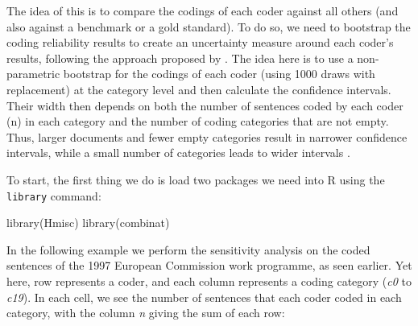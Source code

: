 \documentclass[
]{article}
\newenvironment{Shaded}{\begin{snugshade}}{\end{snugshade}}
\newcommand{\FunctionTok}[1]{\textcolor[rgb]{0.00,0.00,0.00}{#1}}
\newcommand{\NormalTok}[1]{#1}
\begin{document}
The idea of this is to compare the codings of each coder against all others (and also against a benchmark or a gold standard). To do so, we need to bootstrap the coding reliability results to create an uncertainty measure around each coder's results, following the approach proposed by \textcite{Benoit2009a}. The idea here is to use a non-parametric bootstrap for the codings of each coder (using 1000 draws with replacement) at the category level and then calculate the confidence intervals. Their width then depends on both the number of sentences coded by each coder (n) in each category and the number of coding categories that are not empty. Thus, larger documents and fewer empty categories result in narrower confidence intervals, while a small number of categories leads to wider intervals \autocite{Lowe2011a}.

To start, the first thing we do is load two packages we need into R using the \texttt{library} command:

\begin{Shaded}
\begin{Highlighting}[]
\FunctionTok{library}\NormalTok{(Hmisc)}
\FunctionTok{library}\NormalTok{(combinat)}
\end{Highlighting}
\end{Shaded}

In the following example we perform the sensitivity analysis on the coded sentences of the 1997 European Commission work programme, as seen earlier. Yet here, row represents a coder, and each column represents a coding category (\emph{c0} to \emph{c19}). In each cell, we see the number of sentences that each coder coded in each category, with the column \emph{n} giving the sum of each row:
\end{document}
